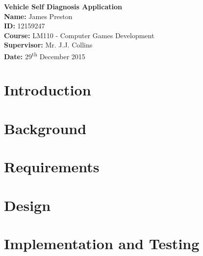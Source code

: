 \documentclass[12pt]{report}
\begin{document}
\begin{titlepage}
	\begin{center}		
		\vspace*{5cm}
		\textbf{\LARGE{Vehicle Self Diagnosis Application}}\\
		\vspace{6cm}
		\large{		
		\textbf{Name:} James Preston\\
		\textbf{ID:} 12159247\\
		\textbf{Course:} LM110 - Computer Games Development\\
		\textbf{Supervisor:} Mr. J.J. Collins\\
		\textbf{Date:} 29\textsuperscript{th} December 2015 \\
		}
	\end{center}
\end{titlepage}

	\tableofcontents
	\newpage
	
	\chapter{Introduction}
		
	\newpage 
	
	\chapter{Background}
		
	\newpage

	\chapter{Requirements}
		
	\newpage	

	\chapter{Design}
		
	\newpage
	
	\chapter{Implementation and Testing}
		
	\newpage
	
	
	
\end{document}
